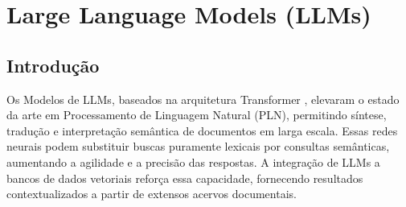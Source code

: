 \section{Large Language Models (LLMs)}
\label{sec:llm}

\subsection{Introdução}
Os Modelos de LLMs, baseados na arquitetura
Transformer \cite{vaswani2017attention,naveeda2024comprehensive}, elevaram o
estado da arte em Processamento de Linguagem Natural (PLN), permitindo síntese,
tradução e interpretação semântica de documentos em larga escala. Essas redes neurais podem substituir buscas
puramente lexicais por consultas semânticas, aumentando a agilidade e a
precisão das respostas. A integração de LLMs a bancos de dados vetoriais
\cite{taipalus2024vector,qwak2024integrating} reforça essa capacidade,
fornecendo resultados contextualizados a partir de extensos acervos
documentais.

